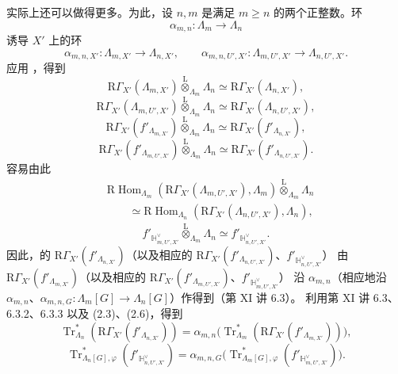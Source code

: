 实际上还可以做得更多。为此，设 $n,m$ 是满足 $m\geq n$ 的两个正整数。环
\[
\alpha_{m,n}:\Lambda_m\longrightarrow\Lambda_n
\]
诱导 $X'$ 上的环
\[
\alpha_{m,n,X'}:\Lambda_{m,X'}\longrightarrow\Lambda_{n,X'},\qquad
\alpha_{m,n,U',X'}:\Lambda_{m,U',X'}\longrightarrow\Lambda_{n,U',X'}.
\]
应用 ，得到
\[
\mathrm R\Gamma_{X'}(\Lambda_{m,X'})\mathbin{\overset{\mathrm L}{\otimes}}_{\Lambda_m}\Lambda_n
\simeq\mathrm R\Gamma_{X'}(\Lambda_{n,X'}),
\tag{2.1}
\]
\[
\mathrm R\Gamma_{X'}(\Lambda_{m,U',X'})\mathbin{\overset{\mathrm L}{\otimes}}_{\Lambda_m}\Lambda_n
\simeq\mathrm R\Gamma_{X'}(\Lambda_{n,U',X'}),
\tag{2.2}
\]
\[
\mathrm R\Gamma_{X'}(f'_{\Lambda_{m,X'}})\mathbin{\overset{\mathrm L}{\otimes}}_{\Lambda_m}\Lambda_n
\simeq\mathrm R\Gamma_{X'}(f'_{\Lambda_{n,X'}}),
\tag{2.3}
\]
\[
\mathrm R\Gamma_{X'}(f'_{\Lambda_{m,U',X'}})\mathbin{\overset{\mathrm L}{\otimes}}_{\Lambda_m}\Lambda_n
\simeq\mathrm R\Gamma_{X'}(f'_{\Lambda_{n,U',X'}}).
\tag{2.4}
\]
容易由此
\[
\begin{aligned}
{}&\mathrm R\operatorname{Hom}_{\Lambda_m}
 (\mathrm R\Gamma_{X'}(\Lambda_{m,U',X'}),\Lambda_m)
 \mathbin{\overset{\mathrm L}{\otimes}}_{\Lambda_m}\Lambda_n\\
&\hspace{2em}\simeq\mathrm R\operatorname{Hom}_{\Lambda_n}
 (\mathrm R\Gamma_{X'}(\Lambda_{n,U',X'}),\Lambda_n),
\end{aligned}
\tag{2.5}
\]
\[
f'_{\mathbb H_{m,U',X'}^\vee}\mathbin{\overset{\mathrm L}{\otimes}}_{\Lambda_m}\Lambda_n
\simeq f'_{\mathbb H_{n,U',X'}^\vee}.
\tag{2.6}
\]
因此，的
$\mathrm R\Gamma_{X'}(f'_{\Lambda_{n,X'}})$（以及相应的
$\mathrm R\Gamma_{X'}(f'_{\Lambda_{n,U',X'}})$、$f'_{\mathbb H_{n,U',X'}^\vee}$）
由 $\mathrm R\Gamma_{X'}(f'_{\Lambda_{m,X'}})$（以及相应的
$\mathrm R\Gamma_{X'}(f'_{\Lambda_{m,U',X'}})$、$f'_{\mathbb H_{m,U',X'}^\vee}$）
沿 $\alpha_{m,n}$（相应地沿 $\alpha_{m,n}$、$\alpha_{m,n,G}:\Lambda_m[G]\longrightarrow\Lambda_n[G]$）作得到（第 XI 讲 6.3）。
利用第 XI 讲 6.3、6.3.2、6.3.3 以及 (2.3)、(2.6)，得到
\[
\operatorname{Tr}^{*}_{\Lambda_n}(\mathrm R\Gamma_{X'}(f'_{\Lambda_{n,X'}}))
=\alpha_{m,n}\bigl(\operatorname{Tr}^{*}_{\Lambda_m}
 (\mathrm R\Gamma_{X'}(f'_{\Lambda_{m,X'}}))\bigr),
\tag{2.7}
\]
\[
\operatorname{Tr}^{*}_{\Lambda_n[G],\varphi}(f'_{\mathbb H_{n,U',X'}^\vee})
=\alpha_{m,n,G}\bigl(\operatorname{Tr}^{*}_{\Lambda_m[G],\varphi}
 (f'_{\mathbb H_{m,U',X'}^\vee})\bigr).
\tag{2.8}
\]
